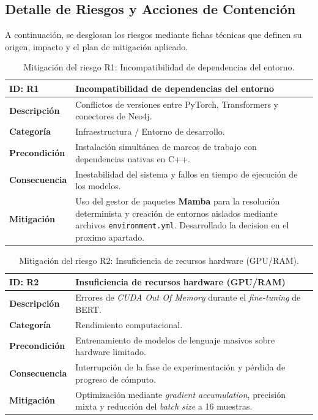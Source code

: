 \documentclass[12pt,a4paper,onecolumn,oneside]{report}
\begin{document}
\subsection{Detalle de Riesgos y Acciones de Contención}

A continuación, se desglosan los riesgos mediante fichas técnicas que definen su origen, impacto y el plan de mitigación aplicado.

\begin{table}[htbp]
\centering
\small
\begin{tabular}{|p{2.5cm}|p{10.5cm}|}
\hline
\rowcolor[RGB]{230,230,230} \textbf{ID: R1} & \textbf{Incompatibilidad de dependencias del entorno} \\ \hline
\textbf{Descripción} & Conflictos de versiones entre PyTorch, Transformers y conectores de Neo4j. \\ \hline
\textbf{Categoría} & Infraestructura / Entorno de desarrollo. \\ \hline
\textbf{Precondición} & Instalación simultánea de marcos de trabajo con dependencias nativas en C++. \\ \hline
\textbf{Consecuencia} & Inestabilidad del sistema y fallos en tiempo de ejecución de los modelos. \\ \hline
\textbf{Mitigación} & Uso del gestor de paquetes \textbf{Mamba} para la resolución determinista y creación de entornos aislados mediante archivos \texttt{environment.yml}. Desarrollado la decision en el proximo apartado. \\ \hline
\end{tabular}
\label{tab:R1}
\caption{Mitigación del riesgo R1: Incompatibilidad de dependencias del entorno.}
\end{table}

\begin{table}[htbp]
\centering
\small
\begin{tabular}{|p{2.5cm}|p{10.5cm}|}
\hline
\rowcolor[RGB]{230,230,230} \textbf{ID: R2} & \textbf{Insuficiencia de recursos hardware (GPU/RAM)} \\ \hline
\textbf{Descripción} & Errores de \textit{CUDA Out Of Memory} durante el \textit{fine-tuning} de BERT. \\ \hline
\textbf{Categoría} & Rendimiento computacional. \\ \hline
\textbf{Precondición} & Entrenamiento de modelos de lenguaje masivos sobre hardware limitado. \\ \hline
\textbf{Consecuencia} & Interrupción de la fase de experimentación y pérdida de progreso de cómputo. \\ \hline
\textbf{Mitigación} & Optimización mediante \textit{gradient accumulation}, precisión mixta y reducción del \textit{batch size} a 16 muestras. \\ \hline
\end{tabular}
\label{tab:R2}
\caption{Mitigación del riesgo R2: Insuficiencia de recursos hardware (GPU/RAM).}
\end{table}
\end{document}
